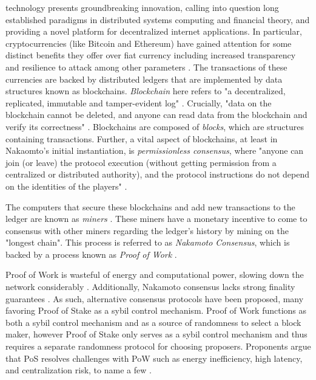 \documentclass[10pt,journal,compsoc]{IEEEtran}
\begin{document}
% 
% 
% 
% 
 technology presents groundbreaking innovation, calling into question long established paradigms in distributed systems computing and financial theory, and providing a novel platform for decentralized internet applications. In particular, cryptocurrencies (like Bitcoin and Ethereum) have gained attention for some distinct benefits they offer over fiat currency including increased transparency and resilience to attack among other parameters \cite{BitcoinFAQ}. The transactions of these currencies are backed by distributed ledgers that are implemented by data structures known as blockchains. \emph{Blockchain} here refers to "a decentralized, replicated, immutable and tamper-evident log" \cite{Bano}. Crucially, "data on the blockchain cannot be deleted, and anyone can read data from the blockchain and verify its correctness" \cite{Bano}. Blockchains are composed of \emph{blocks}, which are structures containing transactions. Further, a vital aspect of blockchains, at least in Nakaomto's initial instantiation, is \emph{permissionless consensus}, where "anyone can join (or leave) the protocol execution (without getting permission from a centralized or distributed authority), and the protocol instructions do not depend on the identities of the players" \cite{fruitchains}.

The computers that secure these blockchains and add new transactions to the ledger are known as \emph{miners} \cite{SatoshiWhitepaper}. These miners have a monetary incentive to come to consensus with other miners regarding the ledger's history by mining on the "longest chain". This process is referred to as \emph{Nakamoto Consensus}, which is backed by a process known as \emph{Proof of Work} \cite{Bano}. 

Proof of Work is wasteful of energy and computational power, slowing down the network considerably \cite{CromanEtAl}. Additionally, Nakamoto consensus lacks strong finality guarantees \cite{EthPoSFAQ}. As such, alternative consensus protocols have been proposed, many favoring Proof of Stake as a sybil control mechanism. Proof of Work functions as both a sybil control mechanism and as a source of randomness to select a block maker, however Proof of Stake only serves as a sybil control mechanism and thus requires a separate randomness protocol for choosing proposers. Proponents argue that PoS resolves challenges with PoW such as energy inefficiency, high latency, and centralization risk, to name a few \cite{EthPoSFAQ}. 
\end{document}
